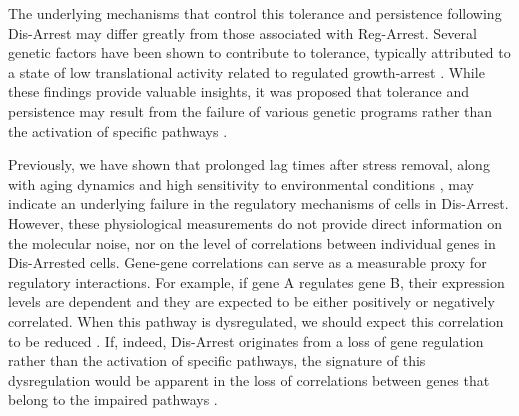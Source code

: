 \documentclass[12pt]{article}
\begin{document}
\par
 The underlying mechanisms that control this tolerance and persistence following Dis-Arrest may differ greatly from those associated with Reg-Arrest. Several genetic factors have been shown to contribute to tolerance, typically attributed to a state of low translational activity related to regulated growth-arrest \cite{Moyed1983,Keren2004,Shah2006,Khare2020,Blattman2024}. While these findings provide valuable insights, it was proposed that tolerance and persistence may result from the failure of various genetic programs rather than the activation of specific pathways \cite{LEVIN201418,Kaplan2021}. 
 \par
 Previously, we have shown that prolonged lag times after stress removal, along with aging dynamics \cite{Kaplan2021} and high sensitivity to environmental conditions \cite{Rotem2024}, may indicate an underlying failure in the regulatory mechanisms of cells in Dis-Arrest. However, these physiological measurements do not provide direct information on the molecular noise, nor on the level of correlations between individual genes in Dis-Arrested cells. Gene-gene correlations can serve as a measurable proxy for regulatory interactions. For example, if gene A regulates gene B, their expression levels are dependent and they are expected to be either positively or negatively correlated. When this pathway is dysregulated, we should expect this correlation to be reduced \cite{Levy2020}. If, indeed, Dis-Arrest originates from a loss of gene regulation rather than the activation of specific pathways, the signature of this dysregulation would be apparent in the loss of correlations between genes that belong to the impaired pathways \cite{Zhu2020}.
 \par
\end{document}

